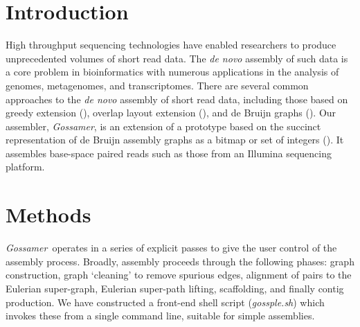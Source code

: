 \documentclass{bioinfo}
\newcommand{\Gossamer}{\textit{Gossamer}}
\newcommand{\SOAPdenovo}{\textit{SOAPdenovo}}
\newcommand{\SGA}{\textit{SGA}}
\begin{document}
\begin{table*}
\caption{Comparison of assembly results for \Gossamer{} (Go), \SOAPdenovo{} (SO), and \SGA{} (SG), when run on the GAGE data sets: Staphylococcus aureus (SA), 2.9 Mb; Rhodobacter sphaeroides (RS), 4.6 Mb, Human chromosome 14 (HG), 88.3 Mb; and Bombus impatiens (BI), estimated 250 Mb.
The columns read as follows: \emph{Num}, the number of sequences produced; \emph{N50}, the N50 statistic calculated with respect to the genome size; \emph{E-size}, the most likely size of the contig or scaffold containing some random base in the genome (see \cite{Salzberg:2011} for details); \emph{Errs}, the number of misjoins and, for the contig value, also the number of indels $>5$ bases; and \emph{N50C}, the N50 calculated after splitting all contigs/scaffolds at error locations. 
}
\label{Tab:results}

\vspace{-2em}

\end{table*}

\vspace{-1.5em}
\section{Introduction}

High throughput sequencing technologies have enabled researchers to produce
unprecedented volumes of short read data.
The \textit{de novo} assembly of such data is a core problem in bioinformatics
with numerous applications in the analysis of genomes, metagenomes, and transcriptomes.
There are several common approaches to the \textit{de novo} 
assembly of short read data, including those based on greedy extension (\cite{Warren:2006p741}), 
overlap layout extension (\cite{Hernandez:2008p735}), and 
de Bruijn graphs (\cite{Chaisson:2009p6352, Zerbino:2009p11086}).  
Our assembler, \Gossamer{}, is an extension of a prototype based on the
succinct representation of de Bruijn assembly graphs as a bitmap or 
set of integers (\cite{Conway:2011p17913}).
It assembles base-space paired reads such as those from an Illumina sequencing platform.

\vspace{-1.5em}
\section{Methods}
\Gossamer{}\ operates in a series of explicit passes
to give the user control of the assembly process.
Broadly, assembly proceeds through the following phases: graph construction,
graph `cleaning' to remove spurious edges,
alignment of pairs to the Eulerian super-graph,
Eulerian super-path lifting, scaffolding, and finally contig production.
We have constructed a front-end shell script (\textit{gossple.sh})
which invokes these from a single command line,
suitable for simple assemblies.
\end{document}
